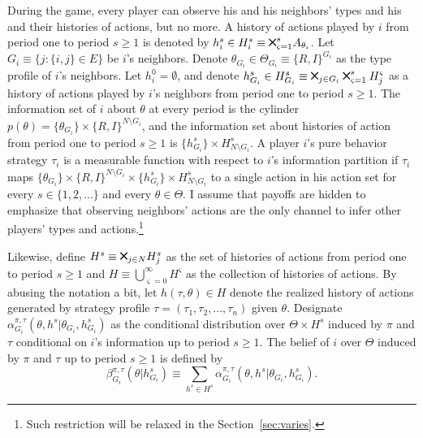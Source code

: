 \documentclass[12pt,letter]{article}
\theoremstyle{definition}
\theoremstyle{remark}
\theoremstyle{claim}
\newcommand{\bigtimes}{\mathbin{\tikz [x=1.4ex,y=1.4ex,line width=.2ex] \draw (0,0) -- (1,1) (0,1) -- (1,0);}}%
\begin{document}
During the game, every player can observe his and his neighbors' types and his and their histories of actions, but no more. A history of actions played by $i$ from period one to period $s\geq 1$ is denoted by $h^s_i\in H^s_{i}\equiv\bigtimes^s_{\varsigma =1} A_{\theta_i}$. Let $G_i\equiv \{j:\{i,j\}\in E\}$ be $i$'s neighbors. Denote $\theta_{G_i}\in \Theta_{G_i}\equiv \{R,I\}^{G_i}$ as the type profile of $i$'s neighbors. Let $h^0_i=\emptyset$, and denote $h^s_{G_i}\in H^s_{G_i}\equiv\bigtimes_{j\in G_i}\bigtimes^s_{\varsigma =1}H^{\varsigma}_j$ as a history of actions played by $i$'s neighbors from period one to period $s\geq 1$. The information set of $i$ about $\theta$ at every period is the cylinder $p(\theta)=\{\theta_{G_i}\}\times \{R,I\}^{N\setminus G_i}$, and the information set about histories of action from period one to period $s\geq 1$ is $\{h^s_{G_i}\}\times H^s_{N\setminus G_i}$. A player $i$'s pure behavior strategy $\tau_{i}$ is a measurable function with respect to $i$'s information partition if $\tau_i$ maps $\{\theta_{G_i}\}\times \{R,I\}^{N\setminus G_i}\times \{h^s_{G_i}\}\times H^s_{N\setminus G_i}$ to a single action in his action set for every $s\in\{1,2,...\}$ and every $\theta\in \Theta$. I assume that payoffs are hidden to emphasize that observing neighbors' actions are the only channel to infer other players' types and actions.\footnote{Such restriction will be relaxed in the Section~\ref{sec:varies}.} 

Likewise, define $H^s\equiv\bigtimes_{j\in N} H^s_{j}$ as the set of histories of actions from period one to period $s\geq 1$ and $H\equiv \bigcup^{\infty}_{\varsigma=0} H^{\varsigma}$ as the collection of histories of actions. By abusing the notation a bit, let $h({\tau},\theta)\in H$ denote the realized history of actions generated by strategy profile $\tau=(\tau_1,\tau_2,...,\tau_n)$ given $\theta$. Designate $\alpha^{\pi,\tau}_{G_i}(\theta, h^{s}|\theta_{G_i},h^{s}_{G_i})$ as the conditional distribution over $\Theta\times H^s$ induced by $\pi$ and $\tau$ conditional on $i$'s information up to period $s\geq 1$. The belief of $i$ over $\Theta$ induced by $\pi$ and $\tau$ up to period $s\geq 1$ is defined by 
\[\beta^{\pi,\tau}_{G_i}(\theta|h^{s}_{G_i})\equiv \sum_{h^{s}\in H^s}\alpha^{\pi,\tau}_{G_i}(\theta, h^{s}|\theta_{G_i},h^{s}_{G_i}).\]
\end{document}
